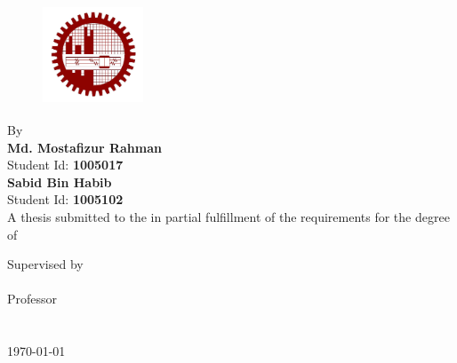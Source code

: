 \documentclass[
12pt, %
oneside, %
english, %
doublespacing, %
headsepline, %
]{MastersDoctoralThesis} %
\author{{Md.Mostafizur  Rahman \\ID: 1005017} {\\Sabid Bin Habib \\ID: 1005102}} %
\begin{document}
\frontmatter %

\pagestyle{plain} %


\begin{titlepage}
\begin{center}
\begin{Huge}
\textbf{\ttitle }
\end{Huge}{}

     
\vspace{0.5cm}
\begin{figure}[!h]
\centering
\includegraphics[width=3cm, height=3cm]{Figures/buet.jpg}
\label{fig:buet}
\end{figure}
\vspace{1.5cm}
{By}\\
\textbf{Md. Mostafizur Rahman}\\
Student Id: \textbf{1005017}\\
\textbf{Sabid Bin Habib}\\
Student Id: \textbf{1005102}\\ 
\vfill
A thesis submitted to the {\deptname} in partial fulfillment of the requirements for the degree of
		\degreename 
        \vspace{0.6cm}
        

        Supervised by\\
        \textbf{\supname}\\[.5cm]
        Professor\\
        {\deptname}\\
        {\univname}\\[2cm]
{\large \today}\\[4cm] %
 

\end{center}
\end{titlepage}
\end{document}
